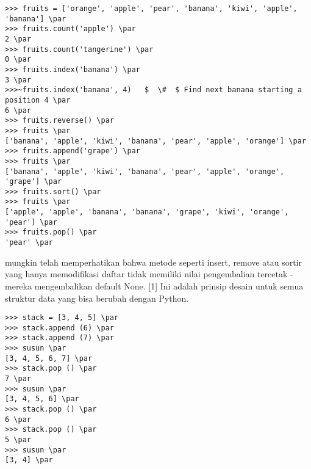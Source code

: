 \begin{verbatim}
>>> fruits = ['orange', 'apple', 'pear', 'banana', 'kiwi', 'apple', 'banana'] \par
>>> fruits.count('apple') \par
2 \par
>>> fruits.count('tangerine') \par
0 \par
>>> fruits.index('banana') \par
3 \par
>>>~fruits.index('banana', 4)   $  \#  $ Find next banana starting a position 4 \par
6 \par
>>> fruits.reverse() \par
>>> fruits \par
['banana', 'apple', 'kiwi', 'banana', 'pear', 'apple', 'orange'] \par
>>> fruits.append('grape') \par
>>> fruits \par
['banana', 'apple', 'kiwi', 'banana', 'pear', 'apple', 'orange', 'grape'] \par
>>> fruits.sort() \par
>>> fruits \par
['apple', 'apple', 'banana', 'banana', 'grape', 'kiwi', 'orange', 'pear'] \par
>>> fruits.pop() \par
'pear' \par
\end{verbatim}
\vspace{12pt}
mungkin telah memperhatikan bahwa metode seperti insert, remove atau sortir yang hanya memodifikasi daftar tidak memiliki nilai pengembalian tercetak - mereka mengembalikan default None. [1] Ini adalah prinsip desain untuk semua struktur data yang bisa berubah dengan Python. \par
\vspace{12pt}
\begin{verbatim}
>>> stack = [3, 4, 5] \par
>>> stack.append (6) \par
>>> stack.append (7) \par
>>> susun \par
[3, 4, 5, 6, 7] \par
>>> stack.pop () \par
7 \par
>>> susun \par
[3, 4, 5, 6] \par
>>> stack.pop () \par
6 \par
>>> stack.pop () \par
5 \par
>>> susun \par
[3, 4] \par
\end{verbatim}
\vspace{12pt}
